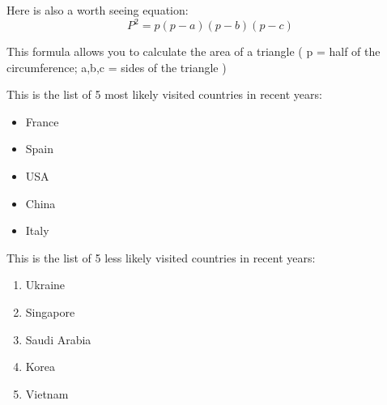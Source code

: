 
\begin{table}[H]
    \centering
    
\end{table}

Here is also a worth seeing equation: \[P^2=p(p-a)(p-b)(p-c)\]

This formula allows you to calculate the area of a triangle ( p = half of the circumference; a,b,c = sides of the triangle ) 


This is the list of 5 most likely visited countries in recent years:
\begin{itemize}
  \item France
  \item Spain
  \item USA
  \item China
  \item Italy
\end{itemize}

This is the list of 5 less likely visited countries in recent years:
\begin{enumerate}
  \item Ukraine
  \item Singapore
  \item Saudi Arabia
  \item Korea
  \item Vietnam
\end{enumerate}